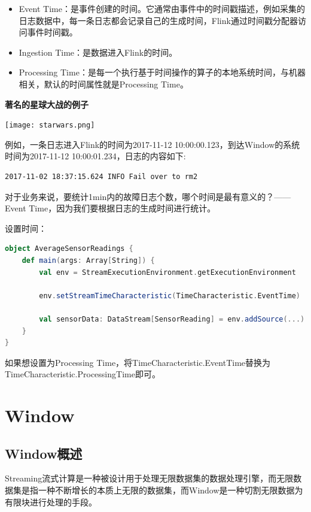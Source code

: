 \documentclass[oneside]{ctexbook}
\begin{document}
\begin{itemize}
\item Event Time：是事件创建的时间。它通常由事件中的时间戳描述，例如采集的日志数据中，每一条日志都会记录自己的生成时间，Flink通过时间戳分配器访问事件时间戳。
\item Ingestion Time：是数据进入Flink的时间。
\item Processing Time：是每一个执行基于时间操作的算子的本地系统时间，与机器相关，默认的时间属性就是Processing Time。
\end{itemize}

\textbf{著名的星球大战的例子}

\noindent \texttt{[image: starwars.png]}

例如，一条日志进入Flink的时间为2017-11-12 10:00:00.123，到达Window的系统时间为2017-11-12 10:00:01.234，日志的内容如下:

\begin{lstlisting}
2017-11-02 18:37:15.624 INFO Fail over to rm2
\end{lstlisting}

对于业务来说，要统计1min内的故障日志个数，哪个时间是最有意义的？—— Event Time，因为我们要根据日志的生成时间进行统计。

设置时间：

\begin{lstlisting}[language=scala]
object AverageSensorReadings {
    def main(args: Array[String]) {
        val env = StreamExecutionEnvironment.getExecutionEnvironment

        env.setStreamTimeCharacteristic(TimeCharacteristic.EventTime)

        val sensorData: DataStream[SensorReading] = env.addSource(...)
    }
}
\end{lstlisting}

如果想设置为Processing Time，将TimeCharacteristic.EventTime替换为TimeCharacteristic.ProcessingTime即可。

\section{Window}

\subsection{Window概述}

Streaming流式计算是一种被设计用于处理无限数据集的数据处理引擎，而无限数据集是指一种不断增长的本质上无限的数据集，而Window是一种切割无限数据为有限块进行处理的手段。
\end{document}

